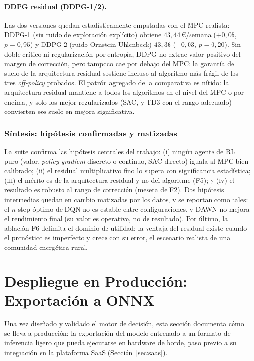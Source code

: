\documentclass[12pt, a4paper, twoside]{report}
\begin{document}
\paragraph{DDPG residual (DDPG-1/2).} Las dos versiones quedan
estadísticamente empatadas con el MPC realista: DDPG-1 (sin ruido de
exploración explícito) obtiene $43{,}44$\,€/semana ($+0{,}05$, $p=0{,}95$) y
DDPG-2 (ruido Ornstein-Uhlenbeck) $43{,}36$ ($-0{,}03$, $p=0{,}20$). Sin doble
crítico ni regularización por entropía, DDPG no extrae valor positivo del
margen de corrección, pero tampoco cae por debajo del MPC: la garantía de
suelo de la arquitectura residual sostiene incluso al algoritmo más frágil de
los tres \textit{off-policy} probados. El patrón agregado de la comparativa
es nítido: la arquitectura residual mantiene a todos los algoritmos en el
nivel del MPC o por encima, y solo los mejor regularizados (SAC, y TD3 con el
rango adecuado) convierten ese suelo en mejora significativa.

\subsubsection{Síntesis: hipótesis confirmadas y matizadas}

La suite confirma las hipótesis centrales del trabajo: (i) ningún agente de RL
puro (valor, \textit{policy-gradient} discreto o continuo, SAC directo) iguala
al MPC bien calibrado; (ii) el residual multiplicativo fino lo supera con
significancia estadística; (iii) el mérito es de la arquitectura residual y no
del algoritmo (F5); y (iv) el resultado es robusto al rango de corrección
(meseta de F2). Dos hipótesis intermedias quedan en cambio matizadas por los
datos, y se reportan como tales: el $n$-step óptimo de DQN no es estable entre
configuraciones, y DAWN no mejora el rendimiento final (su valor es operativo,
no de resultado). Por último, la ablación F6 delimita el dominio de utilidad:
la ventaja del residual existe cuando el pronóstico es imperfecto y crece con
su error, el escenario realista de una comunidad energética rural.

\section{Despliegue en Producción: Exportación a ONNX}
\label{sec:onnx}

Una vez diseñado y validado el motor de decisión, esta sección documenta cómo
se lleva a producción: la exportación del modelo entrenado a un formato de
inferencia ligero que pueda ejecutarse en hardware de borde, paso previo a su
integración en la plataforma SaaS (Sección~\ref{sec:saas}).
\end{document}
